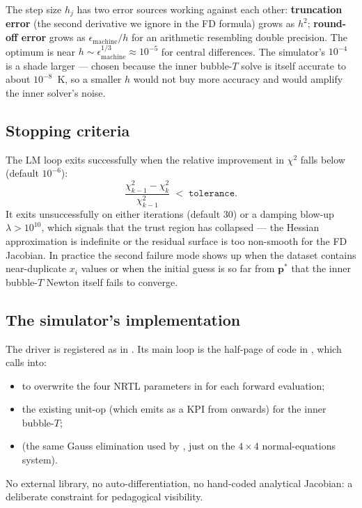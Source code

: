\documentclass[11pt,a4paper]{article}
\newcommand{\pv}{\mathbf{p}}                          %
\begin{document}
\begin{pitfall}
The step size $h_j$ has two error sources working against each other:
\textbf{truncation error} (the second derivative we ignore in the FD
formula) grows as $h^2$; \textbf{round-off error} grows as
$\epsilon_{\mathrm{machine}} / h$ for an arithmetic resembling double
precision. The optimum is near $h \sim \epsilon_{\mathrm{machine}}^{1/3}
\approx 10^{-5}$ for central differences. The simulator's $10^{-4}$ is a
shade larger --- chosen because the inner bubble-$T$ solve is itself
accurate to about $10^{-8}$~K, so a smaller $h$ would not buy more
accuracy and would amplify the inner solver's noise.
\end{pitfall}

\subsection{Stopping criteria}

The LM loop exits successfully when the relative improvement in
$\chi^2$ falls below  (default $10^{-6}$):
\begin{equation}
   \frac{\chi^2_{k-1} - \chi^2_k}{\chi^2_{k-1}}
   \;<\; \texttt{tolerance}.
\end{equation}
It exits unsuccessfully on either  iterations (default
$30$) or a damping blow-up $\lambda > 10^{10}$, which signals that the
trust region has collapsed --- the Hessian approximation is indefinite
or the residual surface is too non-smooth for the FD Jacobian. In
practice the second failure mode shows up when the dataset contains
near-duplicate $x_i$ values or when the initial guess is so far from
$\pv^*$ that the inner bubble-$T$ Newton itself fails to converge.

\subsection{The simulator's implementation}

The driver is registered as
 in . Its main loop
is the half-page of code in ,
which calls into:
\begin{itemize}[leftmargin=*,nosep]
  \item {} to overwrite the four
        NRTL parameters in  for each forward
        evaluation;
  \item the existing  unit-op (which emits
         as a KPI from onwards) for the inner
        bubble-$T$;
  \item {} (the same Gauss elimination used by
        , just on the $4\times 4$ normal-equations
        system).
\end{itemize}
No external library, no auto-differentiation, no hand-coded analytical
Jacobian: a deliberate constraint for pedagogical visibility.
\end{document}

